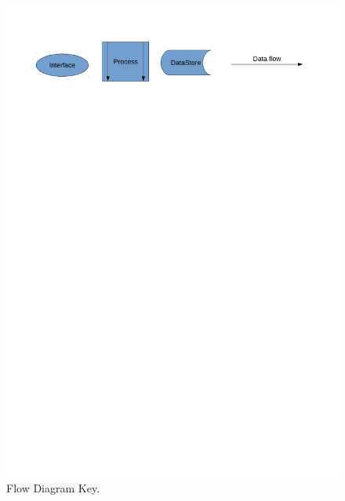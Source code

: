 \documentclass[a4paper,12pt]{report}
\begin{document}
\begin{figure}[H]
    \caption{Flow Diagram Key.} \label{fig:print_function_result}
    \includegraphics[width=\textwidth]{./Dataflow/DFD_analysis_key.pdf}
\end{figure}
\end{document}
